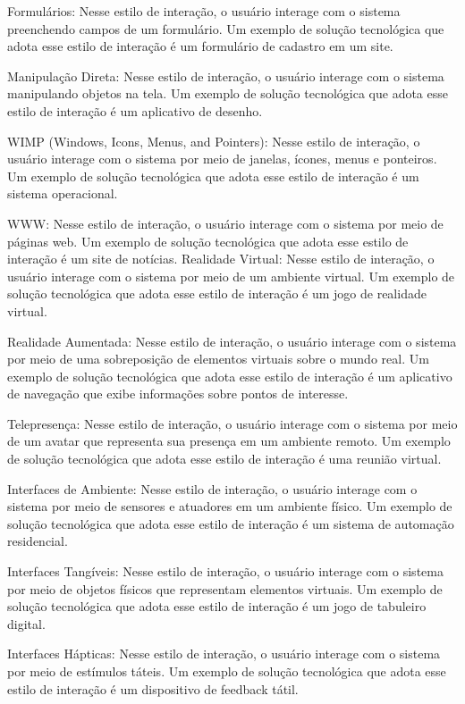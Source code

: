 \documentclass[12pt,a4paper]{article}
\begin{document}
Formulários: Nesse estilo de interação, o usuário interage com o sistema preenchendo campos de um formulário. Um exemplo de solução tecnológica que adota esse estilo de interação é um formulário de cadastro em um site.

Manipulação Direta: Nesse estilo de interação, o usuário interage com o sistema manipulando objetos na tela. Um exemplo de solução tecnológica que adota esse estilo de interação é um aplicativo de desenho.

WIMP (Windows, Icons, Menus, and Pointers): Nesse estilo de interação, o usuário interage com o sistema por meio de janelas, ícones, menus e ponteiros. Um exemplo de solução tecnológica que adota esse estilo de interação é um sistema operacional.

WWW: Nesse estilo de interação, o usuário interage com o sistema por meio de páginas web. Um exemplo de solução tecnológica que adota esse estilo de interação é um site de notícias.
Realidade Virtual: Nesse estilo de interação, o usuário interage com o sistema por meio de um ambiente virtual. Um exemplo de solução tecnológica que adota esse estilo de interação é um jogo de realidade virtual.

Realidade Aumentada: Nesse estilo de interação, o usuário interage com o sistema por meio de uma sobreposição de elementos virtuais sobre o mundo real. Um exemplo de solução tecnológica que adota esse estilo de interação é um aplicativo de navegação que exibe informações sobre pontos de interesse.

Telepresença: Nesse estilo de interação, o usuário interage com o sistema por meio de um avatar que representa sua presença em um ambiente remoto. Um exemplo de solução tecnológica que adota esse estilo de interação é uma reunião virtual.

Interfaces de Ambiente: Nesse estilo de interação, o usuário interage com o sistema por meio de sensores e atuadores em um ambiente físico. Um exemplo de solução tecnológica que adota esse estilo de interação é um sistema de automação residencial.

Interfaces Tangíveis: Nesse estilo de interação, o usuário interage com o sistema por meio de objetos físicos que representam elementos virtuais. Um exemplo de solução tecnológica que adota esse estilo de interação é um jogo de tabuleiro digital.

Interfaces Hápticas: Nesse estilo de interação, o usuário interage com o sistema por meio de estímulos táteis. Um exemplo de solução tecnológica que adota esse estilo de interação é um dispositivo de feedback tátil.
\end{document}
